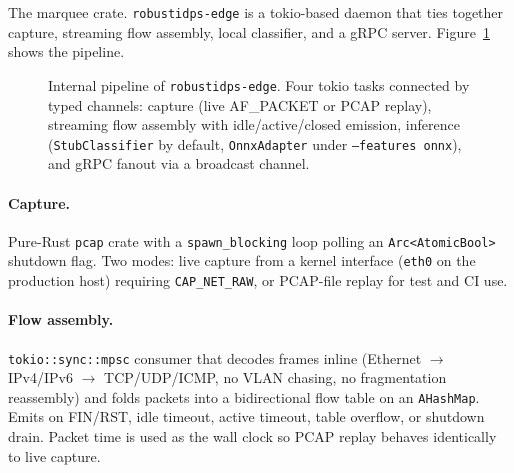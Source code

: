 \documentclass[11pt,a4paper]{article}
\begin{document}
The marquee crate.  \texttt{robustidps-edge} is a tokio-based daemon
that ties together capture, streaming flow assembly, local
classifier, and a gRPC server.  Figure~\ref{fig:edge_pipeline}
shows the pipeline.

\begin{figure}[H]
\centering
{}
\caption{Internal pipeline of \texttt{robustidps-edge}. Four tokio
  tasks connected by typed channels: capture (live AF\_PACKET or
  PCAP replay), streaming flow assembly with idle/active/closed
  emission, inference (\texttt{StubClassifier} by default,
  \texttt{OnnxAdapter} under \texttt{--features onnx}), and gRPC
  fanout via a broadcast channel.}
\label{fig:edge_pipeline}
\end{figure}

\paragraph{Capture.}
Pure-Rust \texttt{pcap} crate with a \texttt{spawn\_blocking} loop
polling an \texttt{Arc<AtomicBool>} shutdown flag.  Two modes: live
capture from a kernel interface (\texttt{eth0} on the production
host) requiring \texttt{CAP\_NET\_RAW}, or PCAP-file replay for
test and CI use.

\paragraph{Flow assembly.}
\texttt{tokio::sync::mpsc} consumer that decodes frames
inline (Ethernet $\to$ IPv4/IPv6 $\to$ TCP/UDP/ICMP, no VLAN
chasing, no fragmentation reassembly) and folds packets into a
bidirectional flow table on an \texttt{AHashMap}.  Emits on
FIN/RST, idle timeout, active timeout, table overflow, or
shutdown drain.  Packet time is used as the wall clock so PCAP
replay behaves identically to live capture.
\end{document}
